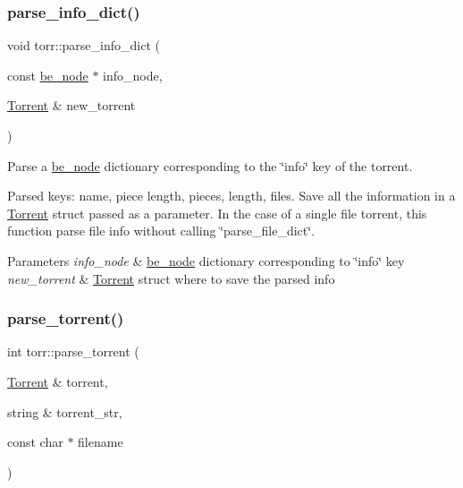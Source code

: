 \subsubsection{\texorpdfstring{parse\+\_\+info\+\_\+dict()}{parse\_info\_dict()}}
{\footnotesize\ttfamily void torr\+::parse\+\_\+info\+\_\+dict (\begin{DoxyParamCaption}\item[{const \hyperlink{structbe__node}{be\+\_\+node} $\ast$}]{info\+\_\+node,  }\item[{\hyperlink{structtorr_1_1Torrent}{Torrent} \&}]{new\+\_\+torrent }\end{DoxyParamCaption})}



Parse a \hyperlink{structbe__node}{be\+\_\+node} dictionary corresponding to the \char`\"{}info\char`\"{} key of the torrent. 

Parsed keys\+: name, piece length, pieces, length, files. Save all the information in a \hyperlink{structtorr_1_1Torrent}{Torrent} struct passed as a parameter. In the case of a single file torrent, this function parse file info without calling \char`\"{}parse\+\_\+file\+\_\+dict\char`\"{}.


\begin{DoxyParams}{Parameters}
{\em info\+\_\+node} & \hyperlink{structbe__node}{be\+\_\+node} dictionary corresponding to \char`\"{}info\char`\"{} key \\
\hline
{\em new\+\_\+torrent} & \hyperlink{structtorr_1_1Torrent}{Torrent} struct where to save the parsed info \\
\hline
\end{DoxyParams}
\mbox{\label{namespacetorr_aadd7f7bbd463cb3b941f548ffd3f7ee1}} 
\subsubsection{\texorpdfstring{parse\+\_\+torrent()}{parse\_torrent()}}
{\footnotesize\ttfamily int torr\+::parse\+\_\+torrent (\begin{DoxyParamCaption}\item[{\hyperlink{structtorr_1_1Torrent}{Torrent} \&}]{torrent,  }\item[{string \&}]{torrent\+\_\+str,  }\item[{const char $\ast$}]{filename }\end{DoxyParamCaption})}




